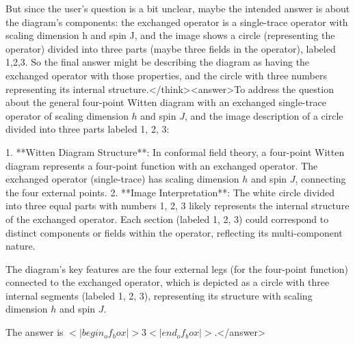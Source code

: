 But since the user's question is a bit unclear, maybe the intended answer is about the diagram's components: the exchanged operator is a single-trace operator with scaling dimension h and spin J, and the image shows a circle (representing the operator) divided into three parts (maybe three fields in the operator), labeled 1,2,3. So the final answer might be describing the diagram as having the exchanged operator with those properties, and the circle with three numbers representing its internal structure.</think><answer>To address the question about the general four-point Witten diagram with an exchanged single-trace operator of scaling dimension \( h \) and spin \( J \), and the image description of a circle divided into three parts labeled 1, 2, 3:  

1. **Witten Diagram Structure**: In conformal field theory, a four-point Witten diagram represents a four-point function with an exchanged operator. The exchanged operator (single-trace) has scaling dimension \( h \) and spin \( J \), connecting the four external points.  
2. **Image Interpretation**: The white circle divided into three equal parts with numbers 1, 2, 3 likely represents the internal structure of the exchanged operator. Each section (labeled 1, 2, 3) could correspond to distinct components or fields within the operator, reflecting its multi-component nature.  

The diagram’s key features are the four external legs (for the four-point function) connected to the exchanged operator, which is depicted as a circle with three internal segments (labeled 1, 2, 3), representing its structure with scaling dimension \( h \) and spin \( J \).  

The answer is \(<|begin_of_box|>3<|end_of_box|>\).</answer>